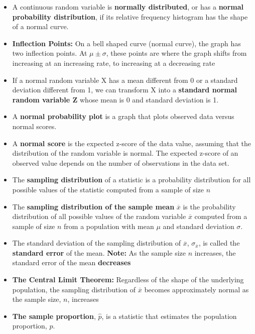 \documentclass{report}
\begin{document}
\begin{itemize}
            \item A continuous random variable is \textbf{normally distributed}, or has a \textbf{normal probability distribution}, if its relative frequency histogram has the shape of a normal curve.
            \item \textbf{Inflection Points:} On a bell shaped curve (normal curve), the graph has two inflection points. At $\mu \pm \sigma$, these points are where the graph shifts from increasing at an increasing rate, to increasing at a decreasing rate
            \item If a normal random variable X has a mean different from 0 or a standard deviation different from 1, we can transform X into a \textbf{standard normal random variable Z} whose mean is 0 and standard deviation is 1. 
            \item A \textbf{normal probability plot} is a graph that plots observed data versus normal scores. 
          \item A \textbf{normal score} is the expected z-score of the data value, assuming that the distribution of the random variable is normal. The expected z-score of an observed value depends on the number of observations in the data set.
                    \item The \textbf{sampling distribution} of a statistic is a probability distribution for all possible values of the statistic computed from a sample of size $n $
        \item The \textbf{sampling distribution of the sample mean} $\overline{x} $ is the probability distribution of all possible values of the random variable $\overline{x} $ computed from a sample of size $n$ from a population with mean $\mu $ and standard deviation $\sigma $.
        \item The standard deviation of the sampling distribution of $\overline{x} $, $\sigma_{\overline{x}} $, is called the \textbf{standard error} of the mean.
            \textbf{Note:} As the sample size $n $ increases, the standard error of the mean \textbf{decreases} 
        \item \textbf{The Central Limit Theorem:} Regardless of the shape of the underlying population, the sampling distribution of $\overline{x} $  becomes approximately normal as the sample size, $n $, increases
         \item \textbf{The sample proportion}, $\hat{p} $, is a statistic that estimates the population proportion, $p $.
    \end{itemize}
\end{document}
